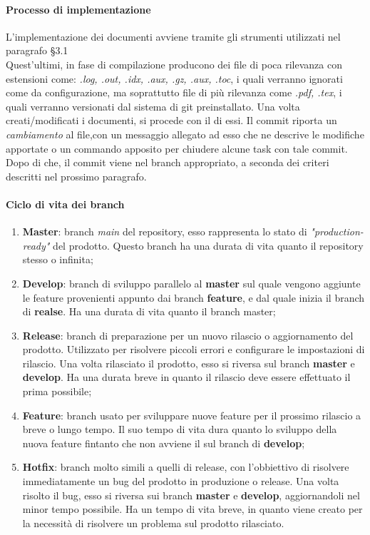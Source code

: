 	\paragraph{Processo di implementazione}
L'implementazione dei documenti avviene tramite gli strumenti utilizzati nel paragrafo §3.1\\
Quest'ultimi, in fase di compilazione producono dei file di poca rilevanza con estensioni come: \textit{.log, .out, .idx, .aux, .gz, .aux, .toc},
i quali verranno ignorati come da configurazione, ma soprattutto file di più rilevanza
come \textit{.pdf, .tex}, i quali verranno versionati dal sistema di git preinstallato.  
Una volta creati/modificati i documenti, si procede con il  di essi. Il commit riporta un \textit{cambiamento} al file,con un messaggio allegato ad esso che ne 
descrive le modifiche apportate o un commando apposito per chiudere alcune task con tale commit. Dopo di che, il commit viene  nel branch appropriato, 
a seconda dei criteri descritti nel prossimo paragrafo. 

\paragraph{Ciclo di vita dei branch}
\begin{enumerate}
	
	\item \textbf{Master}: branch \textit{main} del repository, esso rappresenta lo stato di \textit{"production-ready"} del prodotto. Questo branch ha una durata di vita quanto il repository stesso o infinita;
	\item \textbf{Develop}: branch di sviluppo parallelo al \textbf{master} sul quale vengono aggiunte le feature provenienti appunto dai branch \textbf{feature},
	 e dal quale inizia il branch di \textbf{realse}. Ha una durata di vita quanto il branch master;
	 
	\item \textbf{Release}: branch di preparazione per un nuovo rilascio o aggiornamento del prodotto. 
	Utilizzato per risolvere piccoli errori e configurare le impostazioni di rilascio. Una volta rilasciato il 
	prodotto, esso si riversa sul branch \textbf{master} e \textbf{develop}. Ha una durata breve in quanto il rilascio deve essere effettuato il prima possibile;

	\item \textbf{Feature}: branch usato per sviluppare nuove feature per il prossimo rilascio a breve o lungo tempo. Il suo tempo di vita dura quanto lo sviluppo della nuova feature
	fintanto che non avviene il  sul branch di \textbf{develop};

	\item \textbf{Hotfix}: branch molto simili a quelli di release, con l'obbiettivo di risolvere immediatamente un bug del prodotto in produzione o release. Una volta risolto il bug, 
	esso si riversa sui branch \textbf{master} e \textbf{develop}, aggiornandoli nel minor tempo possibile. Ha un tempo di vita breve, in quanto viene creato per la necessità di risolvere 
	un problema sul prodotto rilasciato. 
	
\end{enumerate}


